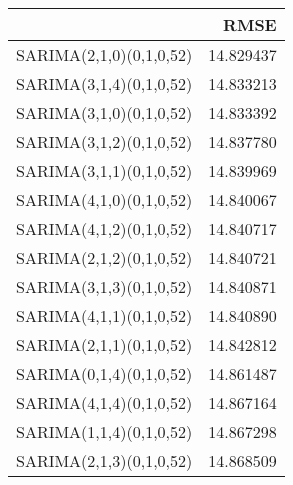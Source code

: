 \begin{tabular}{lr}
\toprule
 & RMSE \\
\midrule
SARIMA(2,1,0)(0,1,0,52) & 14.829437 \\
SARIMA(3,1,4)(0,1,0,52) & 14.833213 \\
SARIMA(3,1,0)(0,1,0,52) & 14.833392 \\
SARIMA(3,1,2)(0,1,0,52) & 14.837780 \\
SARIMA(3,1,1)(0,1,0,52) & 14.839969 \\
SARIMA(4,1,0)(0,1,0,52) & 14.840067 \\
SARIMA(4,1,2)(0,1,0,52) & 14.840717 \\
SARIMA(2,1,2)(0,1,0,52) & 14.840721 \\
SARIMA(3,1,3)(0,1,0,52) & 14.840871 \\
SARIMA(4,1,1)(0,1,0,52) & 14.840890 \\
SARIMA(2,1,1)(0,1,0,52) & 14.842812 \\
SARIMA(0,1,4)(0,1,0,52) & 14.861487 \\
SARIMA(4,1,4)(0,1,0,52) & 14.867164 \\
SARIMA(1,1,4)(0,1,0,52) & 14.867298 \\
SARIMA(2,1,3)(0,1,0,52) & 14.868509 \\
\bottomrule
\end{tabular}
